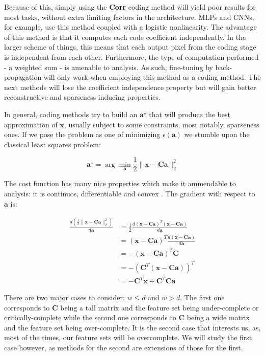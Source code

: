 \documentclass[12pt,a4paper,oneside,english]{UPBThesis}
\begin{document}
Because of this, simply using the \textbf{Corr} coding method will yield poor results for most tasks, without extra limiting factors in the architecture. MLPs and CNNs, for example, use this method coupled with a logistic nonlinearity. The advantage of this method is that it computes each code coefficient independently. In the larger scheme of things, this means that each output pixel from the coding stage is independent from each other. Furthermore, the type of computation performed - a weighted sum - is amenable to analysis. As such, fine-tuning by back-propagation will only work when employing this method as a coding method. The next methods will lose the coefficient independence property but will gain better reconstructive and sparseness inducing properties.

In general, coding methods try to build an $\textbf{a}^\star$ that will produce the best approximation of $\textbf{x}$, usually subject to some constraints, most notably, sparseness ones. If we pose the problem as one of minimizing $\epsilon(\textbf{a})$ we stumble upon the classical least squares problem:

\begin{equation}
\textbf{a}^{\star} = \arg\min_{\textbf{a}} \frac{1}{2} \| \textbf{x} - \textbf{C}\textbf{a} \|_2^2
\end{equation}

The cost function has many nice properties which make it ammendable to analysis: it is continuos, differentiable and convex \cite{elements-statistical-learning}. The gradient with respect to $\textbf{a}$ is:

\begin{align*}
\frac{d \left( \frac{1}{2}\|\textbf{x} - \textbf{C}\textbf{a}\|_2^2 \right)}{d\textbf{a}} & = \frac{1}{2} \frac{d {\left( \textbf{x} - \textbf{C}\textbf{a} \right)}^T\left( \textbf{x} - \textbf{C}\textbf{a} \right)}{d\textbf{a}} \\
& = {\left( \textbf{x} - \textbf{C}\textbf{a} \right)}^T \frac{d \left( \textbf{x} - \textbf{C}\textbf{a} \right)}{d\textbf{a}} \\
& = - {\left( \textbf{x} - \textbf{C}\textbf{a} \right)}^T \textbf{C} \\
& = - {\left( \textbf{C}^T \left( \textbf{x} - \textbf{C}\textbf{a} \right) \right)}^T \\
& = - \textbf{C}^T \textbf{x} + \textbf{C}^T\textbf{C}\textbf{a}
\end{align*}

There are two major cases to consider: $w \leq d$ and $w > d$. The first one corresponds to $\textbf{C}$ being a tall matrix and the feature set being under-complete or critically-complete while the second one corresponds to $\textbf{C}$ being a wide matrix and the feature set being over-complete. It is the second case that interests us, as, most of the times, our feature sets will be overcomplete. We will study the first case however, as methods for the second are extensions of those for the first.
\end{document}
